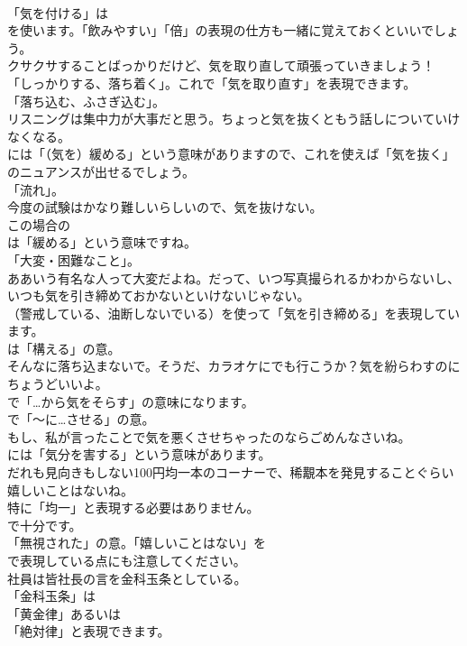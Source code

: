 \documentclass[8pt]{extreport}
\begin{document}
\begin{CJK}{UTF8}{min}
\\	「気を付ける」は
\\	を使います。「飲みやすい」「倍」の表現の仕方も一緒に覚えておくといいでしょう。	
\\	クサクサすることばっかりだけど、気を取り直して頑張っていきましょう！ 
\\	「しっかりする、落ち着く」。これで「気を取り直す」を表現できます。
\\	「落ち込む、ふさぎ込む」。	
\\	リスニングは集中力が大事だと思う。ちょっと気を抜くともう話しについていけなくなる。 
\\	には「（気を）緩める」という意味がありますので、これを使えば「気を抜く」のニュアンスが出せるでしょう。
\\	「流れ」。	
\\	今度の試験はかなり難しいらしいので、気を抜けない。 
\\	この場合の
\\	は「緩める」という意味ですね。
\\	「大変・困難なこと」。	
\\	ああいう有名な人って大変だよね。だって、いつ写真撮られるかわからないし、いつも気を引き締めておかないといけないじゃない。 
\\	（警戒している、油断しないでいる）を使って「気を引き締める」を表現しています。
\\	は「構える」の意。	
\\	そんなに落ち込まないで。そうだ、カラオケにでも行こうか？気を紛らわすのにちょうどいいよ。 
\\	で「…から気をそらす」の意味になります。
\\	で「～に…させる」の意。	
\\	もし、私が言ったことで気を悪くさせちゃったのならごめんなさいね。 
\\	には「気分を害する」という意味があります。	
\\	だれも見向きもしない100円均一本のコーナーで、稀覯本を発見することぐらい嬉しいことはないね。 
\\	特に「均一」と表現する必要はありません。
\\	で十分です。
\\	「無視された」の意。「嬉しいことはない」を
\\	で表現している点にも注意してください。	
\\	社員は皆社長の言を金科玉条としている。 
\\	「金科玉条」は
\\	「黄金律」あるいは
\\	「絶対律」と表現できます。	

\end{CJK}
\end{document}
